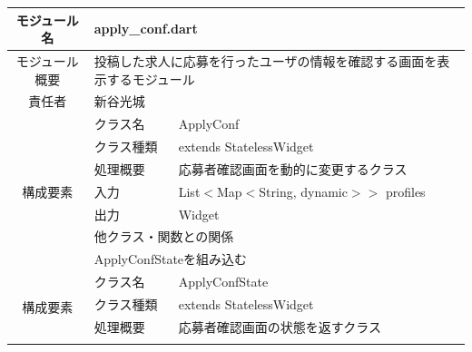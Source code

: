 \begin{table}[H]
  \centering
  \begin{tabular}{|c|l|l|} \hline
    モジュール名                & \multicolumn{2}{l|}{apply\_conf.dart}                                                                           \\ \hline
    モジュール概要               & \multicolumn{2}{p{12cm}|}{投稿した求人に応募を行ったユーザの情報を確認する画面を表示するモジュール}                                                 \\ \hline
    責任者                   & \multicolumn{2}{l|}{新谷光城}                                                                                       \\ \hline
    \multirow{7}{*}{構成要素} & クラス名                                                            & ApplyConf                                     \\ \cline{2-3}
                          & クラス種類                                                           & extends StatelessWidget                       \\ \cline{2-3}
                          & 処理概要                                                            & \multicolumn{1}{p{12cm}|}{応募者確認画面を動的に変更するクラス} \\ \cline{2-3}
                          & 入力                                                              & List$<$Map$<$String, dynamic$>$$>$ profiles   \\ \cline{2-3}
                          & 出力                                                              & Widget                                        \\ \cline{2-3}
                          & \multicolumn{2}{l|}{他クラス・関数との関係}                                                                                \\ \cline{2-3}
                          & \multicolumn{2}{p{14cm}|}{ApplyConfStateを組み込む}                                                                  \\ \hline
    \multirow{7}{*}{構成要素} & クラス名                                                            & ApplyConfState                                \\ \cline{2-3}
                          & クラス種類                                                           & extends StatelessWidget                       \\ \cline{2-3}
                          & 処理概要                                                            & \multicolumn{1}{p{12cm}|}{応募者確認画面の状態を返すクラス}   \\ \cline{2-3}
$$
\end{tabular}
\end{table}
